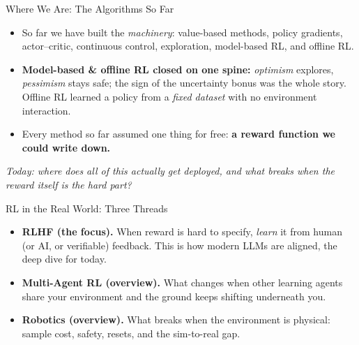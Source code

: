 \begin{frame}{Where We Are: The Algorithms So Far}
\begin{itemize}\itemsep0.5em
    \item So far we have built the \emph{machinery}: value-based methods, policy
          gradients, actor--critic, continuous control, exploration, model-based
          RL, and offline RL.
    \item \textbf{Model-based \& offline RL closed on one spine:} \emph{optimism} explores,
          \emph{pessimism} stays safe; the sign of the uncertainty bonus was
          the whole story. Offline RL learned a policy from a \emph{fixed dataset}
          with no environment interaction.
    \item Every method so far assumed one thing for free: \textbf{a reward
          function we could write down.}
\end{itemize}
\vfill
\begin{center}
\itshape Today: where does all of this actually get deployed, and what breaks
when the reward itself is the hard part?
\end{center}
\end{frame}

\begin{frame}{RL in the Real World: Three Threads}
\begin{itemize}\itemsep0.6em
    \item \textbf{RLHF (the focus).} When reward is hard to specify, \emph{learn}
          it from human (or AI, or verifiable) feedback. This is how modern
          LLMs are aligned, the deep dive for today.
    \item \textbf{Multi-Agent RL (overview).} What changes when other learning
          agents share your environment and the ground keeps shifting underneath
          you.
    \item \textbf{Robotics (overview).} What breaks when the environment is
          physical: sample cost, safety, resets, and the sim-to-real gap.
\end{itemize}
\end{frame}

